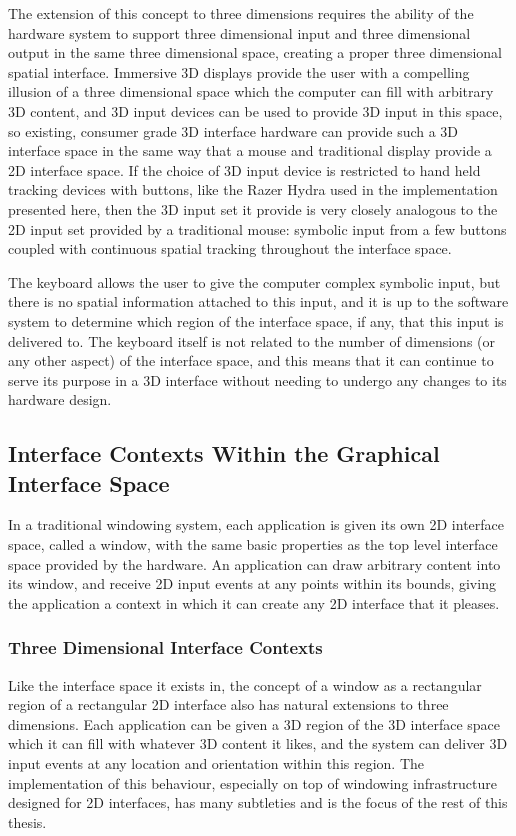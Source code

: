 The extension of this concept to three dimensions requires the ability of the hardware system to support three dimensional input and three dimensional output in the same three dimensional space, creating a proper three dimensional spatial interface. Immersive 3D displays provide the user with a compelling illusion of a three dimensional space which the computer can fill with arbitrary 3D content, and 3D input devices can be used to provide 3D input in this space, so existing, consumer grade 3D interface hardware can provide such a 3D interface space in the same way that a mouse and traditional display provide a 2D interface space. If the choice of 3D input device is restricted to hand held tracking devices with buttons, like the Razer Hydra used in the implementation presented here, then the 3D input set it provide is very closely analogous to the 2D input set provided by a traditional mouse: symbolic input from a few buttons coupled with continuous spatial tracking throughout the interface space.

The keyboard allows the user to give the computer complex symbolic input, but there is no spatial information attached to this input, and it is up to the software system to determine which region of the interface space, if any, that this input is delivered to. The keyboard itself is not related to the number of dimensions (or any other aspect) of the interface space, and this means that it can continue to serve its purpose in a 3D interface without needing to undergo any changes to its hardware design.

\subsection{Interface Contexts Within the Graphical Interface Space}
In a traditional windowing system, each application is given its own 2D interface space, called a window, with the same basic properties as the top level interface space provided by the hardware. An application can draw arbitrary content into its window, and receive 2D input events at any points within its bounds, giving the application a context in which it can create any 2D interface that it pleases. 

\subsubsection{Three Dimensional Interface Contexts}

Like the interface space it exists in, the concept of a window as a rectangular region of a rectangular 2D interface also has natural extensions to three dimensions. Each application can  be given a 3D region of the 3D interface space which it can fill with whatever 3D content it likes, and the system can deliver 3D input events at any location and orientation within this region. The implementation of this behaviour, especially on top of windowing infrastructure designed for 2D interfaces, has many subtleties and is the focus of the rest of this thesis.


